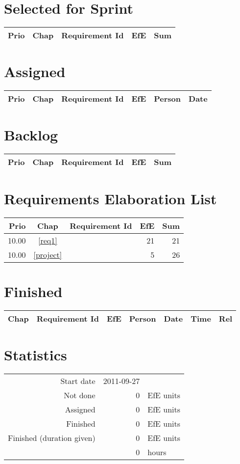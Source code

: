 \section{Selected for Sprint}
\begin{longtable}{|r|c|p{7cm}||r|r|} \hline
\textbf{Prio} & \textbf{Chap} & \textbf{Requirement Id} & \textbf{EfE} & \textbf{Sum} \\ \hline\endhead
\end{longtable}\section{Assigned}
\begin{longtable}{|r|c|p{6.5cm}||r|l|l|} \hline
\textbf{Prio} & \textbf{Chap} & \textbf{Requirement Id} & \textbf{EfE} & \textbf{Person} & \textbf{Date} \\ \hline\endhead
\end{longtable}\section{Backlog}
\begin{longtable}{|r|c|p{7cm}||r|r|} \hline
\textbf{Prio} & \textbf{Chap} & \textbf{Requirement Id} & \textbf{EfE} & \textbf{Sum} \\ \hline\endhead
\end{longtable}\section{Requirements Elaboration List}
\begin{longtable}{|r|c|p{7cm}||r|r|} \hline
\textbf{Prio} & \textbf{Chap} & \textbf{Requirement Id} & \textbf{EfE} & \textbf{Sum} \\ \hline\endhead
10.00 & \ref{req1} & \nameref{req1} & 21 & 21 \\ \hline
10.00 & \ref{project} & \nameref{project} & 5 & 26 \\ \hline
\end{longtable}\section{Finished}
{\small \begin{longtable}{|c|p{5.5cm}||r|l|l|r|r|} \hline
\textbf{Chap} & \textbf{Requirement Id} & \textbf{EfE} & \textbf{Person} & \textbf{Date} & \textbf{Time} & \textbf{Rel} \\ \hline\endhead
\end{longtable}}\section{Statistics}
\begin{longtable}{rrl}
Start date & 2011-09-27 & \\ 
Not done & 0 & EfE units \\ 
Assigned & 0 & EfE units \\ 
Finished & 0 & EfE units \\ 
Finished (duration given) & 0 & EfE units \\ 
 & 0 & hours \\ 
\end{longtable}